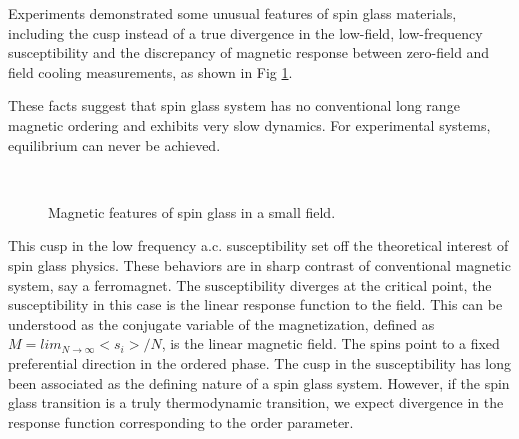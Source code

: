 Experiments demonstrated some unusual features of spin glass materials, 
including the cusp instead of a true divergence in the low-field, low-frequency 
susceptibility and the discrepancy of magnetic response between zero-field and field cooling 
measurements, as shown in Fig \ref{fig:experimentsSG}. 

These facts suggest that spin glass system has no conventional 
long range magnetic ordering and exhibits very slow dynamics. For experimental 
systems, equilibrium can never be achieved. 

\begin{figure}[!h]
  \label{fig:experimentsSG}
  \centering
  \\  
  \caption{Magnetic features of spin glass in a small field.}
\end{figure}

This cusp in the low frequency a.c. susceptibility set off the theoretical interest of spin glass physics. 
These behaviors are in sharp contrast of conventional magnetic system, say a ferromagnet. 
The susceptibility diverges at the critical point, the susceptibility
in this case is the linear response function to the field. This can be understood as the conjugate
variable of the magnetization, defined as $M=lim_{N \rightarrow \infty} <s_{i}> / N$, is the linear magnetic field. 
The spins point to a fixed preferential direction in the ordered phase. The cusp in the susceptibility has long been associated as the defining nature of a spin glass system. However, if the spin glass transition is a truly thermodynamic transition, we expect divergence in the response function corresponding to the order parameter. 

